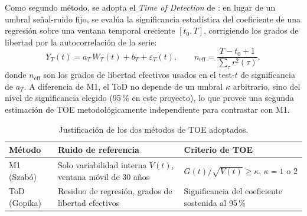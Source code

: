 \documentclass[11pt,a4paper]{article}
\begin{document}
Como segundo m\'etodo, se adopta el \emph{Time of Detection} de \citet{gopika2024}: en lugar de un umbral se\~nal-ruido fijo, se eval\'ua la significancia estad\'istica del coeficiente de una regresi\'on sobre una ventana temporal creciente $[t_0,T]$, corrigiendo los grados de libertad por la autocorrelaci\'on de la serie:
\begin{equation}
\label{eq:tod}
Y_T(t) = a_T\,W_T(t) + b_T + \varepsilon_T(t), \qquad n_{\text{eff}} = \frac{T-t_0+1}{\sum_\tau r^2(\tau)},
\end{equation}
donde $n_{\text{eff}}$ son los grados de libertad efectivos usados en el test-$t$ de significancia de $a_T$. A diferencia de M1, el ToD no depende de un umbral $\kappa$ arbitrario, sino del nivel de significancia elegido (95\,\% en este proyecto), lo que provee una segunda estimaci\'on de TOE metodol\'ogicamente independiente para contrastar con M1.

\begin{table}[htbp]
\caption{Justificaci\'on de los dos m\'etodos de TOE adoptados.}
\label{tab:metodos_toe}
\small
\begin{tabular}{@{}L{2.3cm}L{5.6cm}L{\dimexpr\textwidth-2.3cm-5.6cm-4\tabcolsep\relax}@{}}
\toprule
\textbf{M\'etodo} & \textbf{Ruido de referencia} & \textbf{Criterio de TOE} \\
\midrule
M1 (Szab\'o) & Solo variabilidad interna $V(t)$, ventana m\'ovil de 30 a\~nos & $G(t)/\sqrt{V(t)} \geq \kappa$, $\kappa=1$ o $2$ \\
ToD (Gopika) & Residuo de regresi\'on, grados de libertad efectivos & Significancia del coeficiente sostenida al 95\,\% \\
\bottomrule
\end{tabular}
\end{table}
\end{document}
